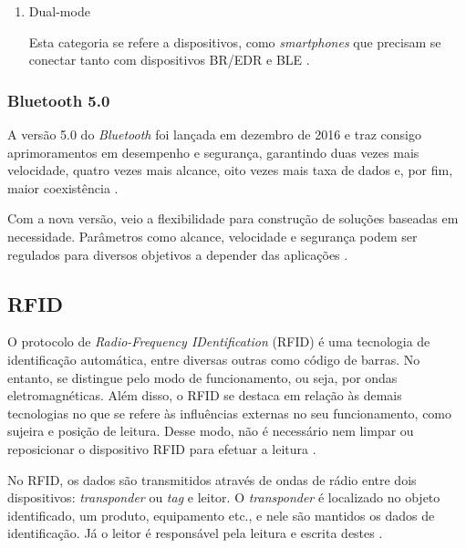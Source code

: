 \begin{enumerate}[label=(\Alph*)]
    \item{Dual-mode}
    
    Esta categoria se refere a dispositivos, como \textit{smartphones} que precisam se conectar tanto com dispositivos BR/EDR e BLE \cite{BluetoothSIG2017a}.

\end{enumerate}

\ProximoForaDoSumario
\subsubsection{Bluetooth 5.0}

A versão 5.0 do \textit{Bluetooth} foi lançada em dezembro de 2016 e traz consigo aprimoramentos em desempenho e segurança, garantindo duas vezes mais velocidade, quatro vezes mais alcance, oito vezes mais taxa de dados e, por fim, maior coexistência \cite{BluetoothSIG2017b}. 

Com a nova versão, veio a flexibilidade para construção de soluções baseadas em necessidade. Parâmetros como alcance, velocidade e segurança podem ser regulados para diversos objetivos a depender das aplicações \cite{BluetoothSIG2017b}.



\subsection{RFID}


O protocolo de \textit{Radio-Frequency IDentification} (RFID) é uma tecnologia de identificação automática, entre diversas outras como código de barras. No entanto, se distingue pelo modo de funcionamento, ou seja, por ondas eletromagnéticas. Além disso, o RFID se destaca em relação às demais tecnologias no que se refere às influências externas no seu funcionamento, como sujeira e posição de leitura. Desse modo, não é necessário nem limpar ou reposicionar o dispositivo RFID para efetuar a leitura \cite{Finkenzeller2010}. 


No RFID, os dados são transmitidos através de ondas de rádio entre dois dispositivos: \textit{transponder} ou \textit{tag} e leitor. O \textit{transponder} é localizado no objeto identificado, um produto, equipamento etc., e nele são mantidos os dados de identificação. Já o leitor é responsável pela leitura e escrita destes \cite{Finkenzeller2010}.

